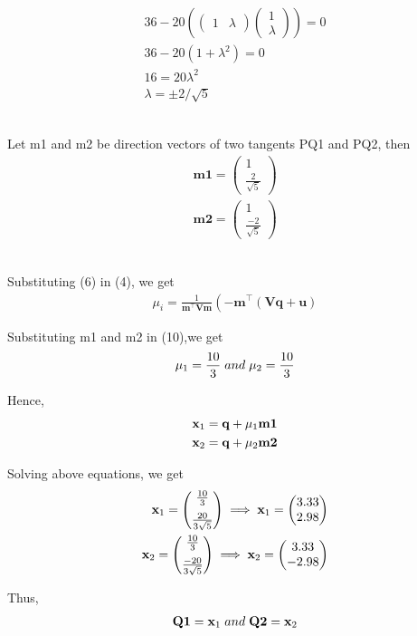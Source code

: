 \documentclass[a4paper,10pt]{report}
\newcommand{\myvec}[1]{\ensuremath{\begin{pmatrix}#1\end{pmatrix}}}
\let\vec\mathbf
\providecommand{\brak}[1]{\ensuremath{\left(#1\right)}}
\providecommand{\lbrak}[1]{\ensuremath{\left(#1\right.}}
\begin{document}
\begin{multicols}{2}
\begin{gather*}
36 - 20\brak{\myvec{1& \lambda}\myvec{1\\ \lambda}}=0\\
36 - 20\brak{1+\lambda^2}=0\\
16 = 20\lambda^2\\
\lambda = \pm 2/\sqrt{5}
\end{gather*}\vspace{0.5cm}\\
\raggedright{Let m1 and m2 be direction vectors of two tangents PQ1 and PQ2, then}
\begin{align*}
\vec{m1}=\myvec{1\\ \frac{2}{\sqrt{5}}}\\
\vec{m2}=\myvec{1\\ \frac{-2}{\sqrt{5}}}
\end{align*}\vspace{0.5cm}\\
\raggedright\large{Substituting (6) in (4), we get}
\begin{align}
\mu_i = \frac{1}
{
\vec{m}^{\top}\vec{V}\vec{m}
}
\lbrak{-\vec{m}^{\top}\brak{\vec{V}\vec{q}+\vec{u}}}
\end{align}
\raggedright\large{Substituting m1 and m2 in (10),we get}\\
\begin{gather*}
\mu_1 = \frac{10}{3} \hspace{0.1cm}and\hspace{0.1cm} \mu_2 = \frac{10}{3}
\end{gather*}
\raggedright\large{Hence,}
\begin{align}
\vec{x}_1 = \vec{q} + \mu_1 \vec{m1}\vspace{2mm}\\
\vec{x}_2 = \vec{q} + \mu_2 \vec{m2}
\end{align}
\raggedright\large{Solving above equations, we get}
\begin{align*}
\vec{x}_1 = \myvec{\frac{10}{3}\vspace{2mm}\\\frac{20}{3\sqrt{5}}}
\implies{\vec{x}_1 = \myvec{3.33 \\ 2.98}}\\
\vec{x}_2 = \myvec{\frac{10}{3}\vspace{2mm}\\\frac{-20}{3\sqrt{5}}}
\implies{\vec{x}_2 = \myvec{3.33 \\ -2.98}}
\end{align*}
\raggedright\large{Thus,}
\begin{align}
\vec{Q1} = \vec{x}_1\hspace{0.1cm} and \hspace{0.1cm}\vec{Q2} = \vec{x}_2
\end{align}\vspace{5mm}\\


\end{multicols}
\end{document}
